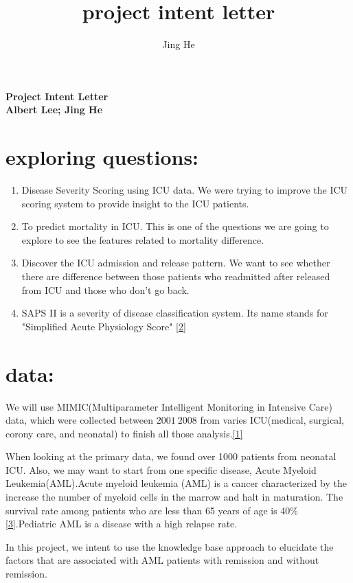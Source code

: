 \documentclass[a4paper,11pt]{article}\usepackage{graphicx, color}
\author{Jing He}
\title{project intent letter}
\begin{document}
\begin{center}
\large\textbf{Project Intent Letter} 
\\
\textbf{ Albert Lee; Jing He }
\end{center}

\section{exploring questions:}
\begin{enumerate}
\item  Disease Severity Scoring using ICU data. We were trying to improve the ICU scoring system to provide insight to the ICU patients.
\item  To predict mortality in ICU. This is one of the questions we are going to explore to see the features related to mortality difference.
\item  Discover the ICU admission and release pattern. We want to see whether there are difference between those patients who readmitted after released from ICU and those who don't go back.
\item  SAPS II is a severity of disease classification system. Its name stands for "Simplified Acute Physiology Score" \ref{2}
\end{enumerate}
\section{data:}
 We will use MIMIC(Multiparameter Intelligent Monitoring in Intensive Care) data, which were 
 collected between $2001~2008$ from varies ICU(medical, surgical, corony care, and neonatal) to finish all those analysis.\ref{1} 

When looking at the primary data, we found over 1000 patients from neonatal ICU. Also, we may want to start from one specific disease, Acute Myeloid Leukemia(AML).Acute myeloid leukemia (AML) is a cancer characterized by the increase the number of myeloid cells in the marrow and halt in maturation. The survival rate among patients who are less than 65 years of age is 40\% \ref{3}.Pediatric AML is a disease with a high relapse rate.

In this project, we intent to use the knowledge base approach to elucidate the factors that are associated with AML patients with remission and without remission. 
\end{document}
